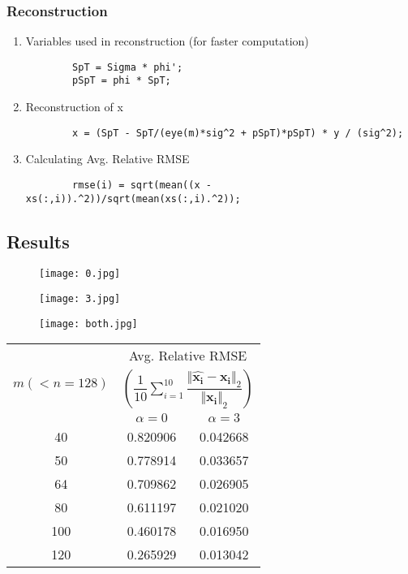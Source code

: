\documentclass[fleqn, 11pt]{article}
\newcommand{\bs}[1]{\boldsymbol{#1}}
\begin{document}
\subsubsection*{Reconstruction}
\begin{enumerate}
    \item Variables used in reconstruction (for faster computation)
        \begin{verbatim}
        SpT = Sigma * phi';
        pSpT = phi * SpT;
        \end{verbatim}

    \item Reconstruction of x
        \begin{verbatim}
        x = (SpT - SpT/(eye(m)*sig^2 + pSpT)*pSpT) * y / (sig^2);
        \end{verbatim}

    \item Calculating Avg. Relative RMSE
        \begin{verbatim}
        rmse(i) = sqrt(mean((x - xs(:,i)).^2))/sqrt(mean(xs(:,i).^2));
        \end{verbatim}
\end{enumerate}

\medskip

\subsection*{Results}

\begin{figure}[H]
    \texttt{[image: 0.jpg]}
\end{figure}
\begin{figure}[H]
    \texttt{[image: 3.jpg]}
\end{figure}
\begin{figure}[H]
    \texttt{[image: both.jpg]}
\end{figure}

\begin{table}[H]
    \centering
    \begin{tabular}{|c||c|c||}
        \hline
        \multirow{3}{*}{$m (< n=128 )$} & \multicolumn{2}{c||}{Avg. Relative RMSE} \\
        & \multicolumn{2}{c||}{$\left( \dfrac{1}{10} \sum\limits_{i=1}^{10} \dfrac{\Vert \bs{\hat{x_i}} - \bs{x_i} \Vert_2}{\Vert \bs{x_i} \Vert_2} \right)$}\\
        \cline{2-3}
        & $\alpha = 0$ & $\alpha = 3$ \\
        \hline
        40 & 0.820906 & 0.042668 \\
        \hline
        50 & 0.778914 & 0.033657 \\
        \hline
        64 & 0.709862 & 0.026905 \\
        \hline
        80 & 0.611197 & 0.021020 \\
        \hline
        100 & 0.460178 & 0.016950 \\
        \hline
        120 & 0.265929 & 0.013042 \\
        \hline
    \end{tabular}
\end{table}
\end{document}
